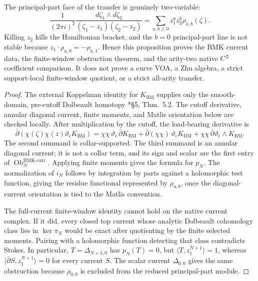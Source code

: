 \documentclass[11pt]{memoir}
\begin{document}
\begin{prop}
  The principal-part face of the transfer is genuinely two-variable:
  \[
    \frac{1}{(2\pi i)^2}
    \frac{d\zeta_1\wedge d\zeta_2}
         {(\zeta_1-z_1)(\zeta_2-z_2)}
    =
    \sum_{a,b\geq0}z_1^az_2^b\rho_{a,b}(\zeta).
  \]
  Killing \(z_2\) kills the Hamiltonian bracket, and the \(b=0\)
  principal-part line is not stable because
  \(z_1\cdot\rho_{a,0}=-\rho_{a,1}\).  Hence this proposition proves the
  BMK current data, the finite-window obstruction theorem, and the
  arity-two native \(C^2\) coefficient comparison.  It does not prove a
  curve VOA, a Zhu algebra, a strict support-local finite-window quotient,
  or a strict all-arity transfer.
\end{prop}

\begin{proof}
  The external Koppelman identity for \(K_{\mathrm{BM}}\) supplies only
  the smooth-domain, pre-cutoff Dolbeault homotopy
  \cite{ruppenthal-bmk}*{\S5, Thm.~5.2}.  The cutoff derivative,
  annular diagonal current, finite moments, and Matlis orientation below
  are checked locally.  After multiplication by the cutoff, the
  load-bearing derivative is
  \[
    \bar\partial(\chi(\zeta)\chi(z)
      \vartheta_\epsilon K_{\mathrm{BM}})
    =
    \chi\chi\,\vartheta_\epsilon\,\bar\partial K_{\mathrm{BM}}
    +\bar\partial(\chi\chi)\,\vartheta_\epsilon K_{\mathrm{BM}}
    +\chi\chi\,\bar\partial\vartheta_\epsilon\wedge K_{\mathrm{BM}} .
  \]
  The second summand is collar-supported.  The third summand is an
  annular diagonal current; it is not a collar term, and its sign and
  scalar are the first entry of
  \(\operatorname{Ob}^{\mathrm{BMK\mbox{-}curr}}_N\).  Applying finite
  moments gives the formula for \(p_N\).  The normalization of \(i_N\)
  follows by integration by parts against a holomorphic test function,
  giving the residue functional represented by \(\rho_{a,b}\), once the
  diagonal-current orientation is tied to the Matlis convention.

  The full-current finite-window identity cannot hold on the native
  current complex.  If it did, every closed top current whose analytic
  Dolbeault cohomology class lies in \(\ker\pi_N\) would be exact after
  quotienting by the finite selected moments.  Pairing with a holomorphic
  function detecting that class contradicts Stokes.  In particular,
  \(T=\Delta_{N+1,0}\) has \(p_N(T)=0\), but
  \(\langle T,z_1^{N+1}\rangle=1\), whereas
  \(\langle\bar\partial S,z_1^{N+1}\rangle=0\) for every current \(S\).
  The scalar current \(\Delta_{0,0}\) gives the same obstruction because
  \(\rho_{0,0}\) is excluded from the reduced principal-part module.


\end{proof}
\end{document}
